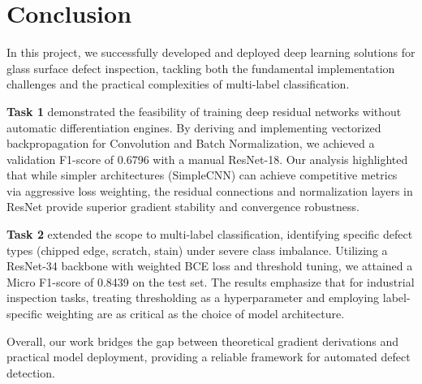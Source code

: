 \section{Conclusion}

In this project, we successfully developed and deployed deep learning solutions for glass surface defect inspection, tackling both the fundamental implementation challenges and the practical complexities of multi-label classification.

\textbf{Task 1} demonstrated the feasibility of training deep residual networks without automatic differentiation engines. By deriving and implementing vectorized backpropagation for Convolution and Batch Normalization, we achieved a validation F1-score of 0.6796 with a manual ResNet-18. Our analysis highlighted that while simpler architectures (SimpleCNN) can achieve competitive metrics via aggressive loss weighting, the residual connections and normalization layers in ResNet provide superior gradient stability and convergence robustness.

\textbf{Task 2} extended the scope to multi-label classification, identifying specific defect types (chipped edge, scratch, stain) under severe class imbalance. Utilizing a ResNet-34 backbone with weighted BCE loss and threshold tuning, we attained a Micro F1-score of 0.8439 on the test set. The results emphasize that for industrial inspection tasks, treating thresholding as a hyperparameter and employing label-specific weighting are as critical as the choice of model architecture.

Overall, our work bridges the gap between theoretical gradient derivations and practical model deployment, providing a reliable framework for automated defect detection.
